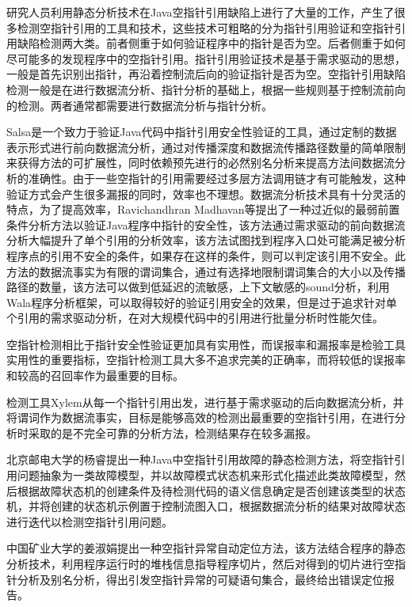 研究人员利用静态分析技术在Java空指针引用缺陷上进行了大量的工作，产生了很多检测空指针引用的工具和技术，这些技术可粗略的分为指针引用验证\cite{madhavan2011null}和空指针引用\cite{xie2007saturn}缺陷检测两大类。前者侧重于如何验证程序中的指针是否为空。后者侧重于如何尽可能多的发现程序中的空指针引用。指针引用验证技术是基于需求驱动的思想\cite{wang2015}，一般是首先识别出指针，再沿着控制流后向的验证指针是否为空。空指针引用缺陷检测一般是在进行数据流分析\cite{wangxu2015}、指针分析的基础上，根据一些规则基于控制流前向的检测。两者通常都需要进行数据流分析与指针分析。

Salsa\cite{loginov2008verifying}是一个致力于验证Java代码中指针引用安全性验证的工具，通过定制的数据表示形式进行前向数据流分析，通过对传播深度和数据流传播路径数量的简单限制来获得方法的可扩展性，同时依赖预先进行的必然别名分析来提高方法间数据流分析的准确性。由于一些空指针的引用需要经过多层方法调用链才有可能触发，这种验证方式会产生很多漏报的同时，效率也不理想。数据流分析技术具有十分灵活的特点，为了提高效率，Ravichandhran Madhavan\cite{madhavan2011null}等提出了一种过近似的最弱前置条件分析方法以验证Java程序中指针的安全性，该方法通过需求驱动的前向数据流分析大幅提升了单个引用的分析效率，该方法试图找到程序入口处可能满足被分析程序点的引用不安全的条件，如果存在这样的条件，则可以判定该引用不安全。此方法的数据流事实为有限的谓词集合，通过有选择地限制谓词集合的大小以及传播路径的数量，该方法可以做到低延迟的流敏感，上下文敏感的sound分析，利用Wala\cite{wala}程序分析框架，可以取得较好的验证引用安全的效果，但是过于追求针对单个引用的需求驱动分析，在对大规模代码中的引用进行批量分析时性能欠佳。

空指针检测相比于指针安全性验证更加具有实用性，而误报率和漏报率是检验工具实用性的重要指标，空指针检测工具大多不追求完美的正确率，而将较低的误报率和较高的召回率作为最重要的目标。

检测工具Xylem\cite{nanda2009accurate}从每一个指针引用出发，进行基于需求驱动的后向数据流分析，并将谓词作为数据流事实，目标是能够高效的检测出最重要的空指针引用，在进行分析时采取的是不完全可靠的分析方法，检测结果存在较多漏报。

北京邮电大学的杨睿\cite{yangrui2012}提出一种Java中空指针引用故障的静态检测方法，将空指针引用问题抽象为一类故障模型，并以故障模式状态机来形式化描述此类故障模型，然后根据故障状态机的创建条件及待检测代码的语义信息确定是否创建该类型的状态机，并将创建的状态机示例置于控制流图入口，根据数据流分析的结果对故障状态进行迭代以检测空指针引用问题。

中国矿业大学的姜淑娟\cite{jiang2017}提出一种空指针异常自动定位方法，该方法结合程序的静态分析技术，利用程序运行时的堆栈信息指导程序切片，然后对得到的切片进行空指针分析及别名分析，得出引发空指针异常的可疑语句集合，最终给出错误定位报告。

